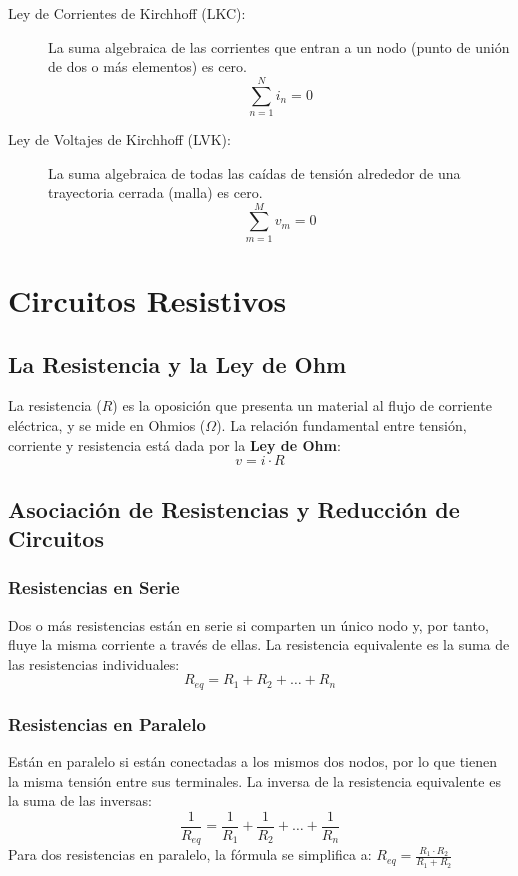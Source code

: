 \documentclass[12pt, a4paper]{article}
\begin{document}
\begin{description}
    \item[Ley de Corrientes de Kirchhoff (LKC):] La suma algebraica de las corrientes que entran a un nodo (punto de unión de dos o más elementos) es cero.
    \[ \sum_{n=1}^{N} i_n = 0 \]
    \item[Ley de Voltajes de Kirchhoff (LVK):] La suma algebraica de todas las caídas de tensión alrededor de una trayectoria cerrada (malla) es cero.
    \[ \sum_{m=1}^{M} v_m = 0 \]
\end{description}

\section{Circuitos Resistivos}

\subsection{La Resistencia y la Ley de Ohm}
La resistencia ($R$) es la oposición que presenta un material al flujo de corriente eléctrica, y se mide en Ohmios ($\Omega$). La relación fundamental entre tensión, corriente y resistencia está dada por la \textbf{Ley de Ohm}:
\[ v = i \cdot R \]

\subsection{Asociación de Resistencias y Reducción de Circuitos}

\subsubsection*{Resistencias en Serie}
Dos o más resistencias están en serie si comparten un único nodo y, por tanto, fluye la misma corriente a través de ellas. La resistencia equivalente es la suma de las resistencias individuales:
\[ R_{eq} = R_1 + R_2 + \dots + R_n \]

\subsubsection*{Resistencias en Paralelo}
Están en paralelo si están conectadas a los mismos dos nodos, por lo que tienen la misma tensión entre sus terminales. La inversa de la resistencia equivalente es la suma de las inversas:
\[ \frac{1}{R_{eq}} = \frac{1}{R_1} + \frac{1}{R_2} + \dots + \frac{1}{R_n} \]
Para dos resistencias en paralelo, la fórmula se simplifica a: $R_{eq} = \frac{R_1 \cdot R_2}{R_1 + R_2}$
\end{document}
